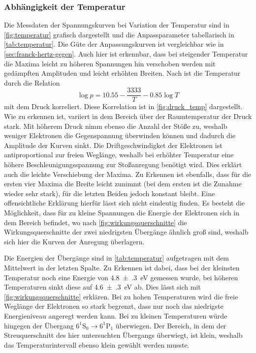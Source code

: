 \subsubsection{Abhängigkeit der Temperatur}
Die Messdaten der Spannungskurven bei Variation der Temperatur 
sind in \cref{fig:temperatur} grafisch dargestellt und die Anpassparameter 
tabellarisch in \cref{tab:temperatur}. Die Güte der Anpassungskurven ist 
vergleichbar wie in \cref{sec:franck-hertz-gegen}. Auch hier ist erkennbar, dass 
bei steigender Temperatur die Maxima leicht zu höheren Spannungen hin verschoben 
werden mit gedämpften Amplituden und leicht erhöhten Breiten. Nach \cite{skript}
ist die Temperatur durch die Relation 
\begin{equation*}
    \log p = \num{10.55}-\frac{3333}{T}-\num{0.85}\log T
\end{equation*}
mit dem Druck korreliert. Diese Korrelation ist in \cref{fig:druck_temp} dargestellt. Wie zu 
erkennen ist, variiert in dem Bereich über der Raumtemperatur der Druck stark. Mit 
höherem Druck nimm ebenso die Anzahl der Stöße zu, weshalb weniger Elektronen die Gegenspannung
überwinden können und dadurch die Amplitude der Kurven sinkt. Die Driftgeschwindigket 
der Elektronen ist antiproportional zur freien Weglänge, weshalb bei erhöhter Temperatur 
eine höhere Beschleunigungsspannung zur Stoßanregung benötigt wird. Dies erklärt auch 
die leichte Verschiebung der Maxima. Zu Erkennen ist ebenfalls, dass für die ersten 
vier Maxima die Breite leicht zunimmt (bei dem ersten ist die Zunahme wieder sehr stark), 
für die letzten Beiden jedoch konstant bleibt. 
Eine offensichtliche Erklärung hierfür lässt sich nicht eindeutig finden. Es besteht 
die Möglichkeit, dass für zu kleine Spannungen die Energie der Elektronen sich in
dem Bereich befindet, wo nach \cref{fig:wirkungsquerschnitte} die Wirkungsquerschnitte
der zwei niedrigsten Übergänge ähnlich groß sind, weshalb sich hier die 
Kurven der Anregung überlagern.

Die Energien der Übergänge sind in \cref{tab:temperatur} aufgetragen mit dem Mittelwert 
in der letzten Spalte. Zu Erkennen ist dabei, dass bei der kleinsten Temperatur noch eine 
Energie von \SI{4.8(3)}{\electronvolt} gemessen wurde, bei höheren Temperaturen 
sinkt diese auf \SI{4.6(3)}{\electronvolt} ab. Dies lässt sich mit \cref{fig:wirkungsquerschnitte}
erklären. Bei zu hohen Temperaturen wird die freie Weglänge der Elektronen so stark begrenzt, 
dass nur noch das niedrigste Energieniveau angeregt werden kann. Bei zu kleinen Temperaturen 
würde hingegen der Übergang $6^1\mathrm S_0\rightarrow 6^1\mathrm P_1$ überwiegen. Der Bereich,
in dem der Streuquerschnitt des hier untersuchten Übergangs überwiegt, ist klein, weshalb 
das Temperaturintervall ebenso klein gewählt werden musste.

